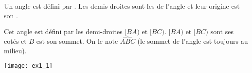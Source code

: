 

\begin{mydef}
	Un angle est défini par . Les demis droites sont les  de l'angle et leur origine est son .
\end{mydef}

\begin{myex}
	\begin{multicols}{2}
		Cet angle est défini par les demi-droites $[BA)$ et $[BC)$. $[BA)$ et $[BC)$ sont ses cotés et $B$ est son sommet.
		On le note $\widehat{ABC}$ (le sommet de l'angle est toujours au milieu).
		
		\texttt{[image: ex1\_1]}
	\end{multicols}
\end{myex}